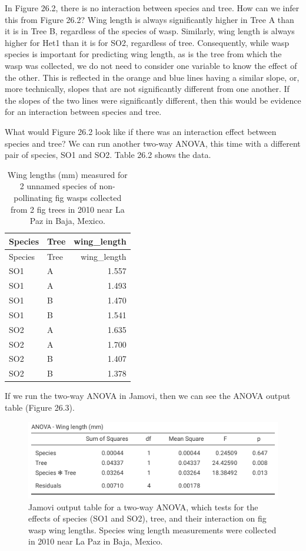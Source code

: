 \documentclass[
]{scrbook}
\begin{document}
In Figure 26.2, there is no interaction between species and tree.
How can we infer this from Figure 26.2?
Wing length is always significantly higher in Tree A than it is in Tree B, regardless of the species of wasp.
Similarly, wing length is always higher for Het1 than it is for SO2, regardless of tree.
Consequently, while wasp species is important for predicting wing length, as is the tree from which the wasp was collected, we do not need to consider one variable to know the effect of the other.
This is reflected in the orange and blue lines having a similar slope, or, more technically, slopes that are not significantly different from one another.
If the slopes of the two lines were significantly different, then this would be evidence for an interaction between species and tree.

What would Figure 26.2 look like if there was an interaction effect between species and tree?
We can run another two-way ANOVA, this time with a different pair of species, SO1 and SO2.
Table 26.2 shows the data.

\begin{longtable}[]{@{}llr@{}}
\caption{\label{tab:unnamed-chunk-122}Wing lengths (mm) measured for 2 unnamed species of non-pollinating fig wasps collected from 2 fig trees in 2010 near La Paz in Baja, Mexico.}\tabularnewline
\toprule
Species & Tree & wing\_length \\
\midrule
\endfirsthead
\toprule
Species & Tree & wing\_length \\
\midrule
\endhead
SO1 & A & 1.557 \\
SO1 & A & 1.493 \\
SO1 & B & 1.470 \\
SO1 & B & 1.541 \\
SO2 & A & 1.635 \\
SO2 & A & 1.700 \\
SO2 & B & 1.407 \\
SO2 & B & 1.378 \\
\bottomrule
\end{longtable}

If we run the two-way ANOVA in Jamovi, then we can see the ANOVA output table (Figure 26.3).

\begin{figure}
\includegraphics[width=1\linewidth]{img/jamovi_two-way_ANOVA_with_interaction} \caption{Jamovi output table for a two-way ANOVA, which tests for the effects of species (SO1 and SO2), tree, and their interaction on fig wasp wing lengths. Species wing length measurements were collected in 2010 near La Paz in Baja, Mexico.}\label{fig:unnamed-chunk-123}
\end{figure}
\end{document}
